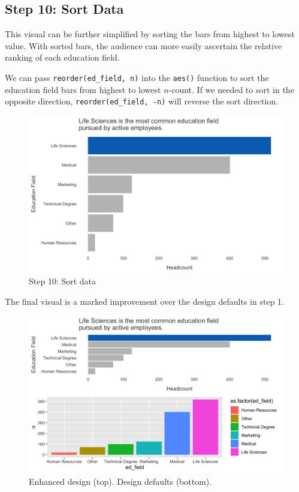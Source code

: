 \documentclass[
]{book}
\begin{document}
\hypertarget{step-10-sort-data}{%
\subsection{Step 10: Sort Data}\label{step-10-sort-data}}

This visual can be further simplified by sorting the bars from highest to lowest value. With sorted bars, the audience can more easily ascertain the relative ranking of each education field.

We can pass \texttt{reorder(ed\_field,\ n)} into the \texttt{aes()} function to sort the education field bars from highest to lowest \(n\)-count. If we needed to sort in the opposite direction, \texttt{reorder(ed\_field,\ -n)} will reverse the sort direction.

\begin{figure}

{\centering \includegraphics[width=1\linewidth]{graphics/viz_step_10} 

}

\caption{Step 10: Sort data}\label{fig:barchart-10}
\end{figure}

The final visual is a marked improvement over the design defaults in step 1.

\begin{figure}

{\centering \includegraphics[width=1\linewidth]{graphics/viz_pre_post} 

}

\caption{Enhanced design (top). Design defaults (bottom).}\label{fig:pre-post-declutter}
\end{figure}
\end{document}
